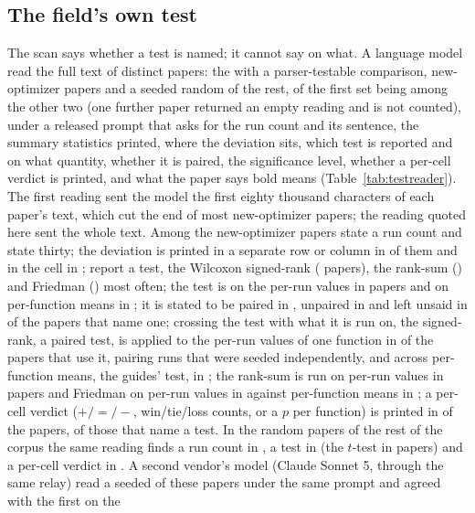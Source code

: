 \documentclass[preprint,review,12pt]{elsarticle}
\begin{document}
\subsection{The field's own test}
\label{sec:tests}

The scan says whether a test is named; it cannot say on what. A language model read the full text of \nTrAllPapers{} distinct papers: the \nTrTestablePapers{} with a parser-testable comparison, \nTrNewOptimizerPapers{} new-optimizer papers and a seeded random \nTrRandomOtherPapers{} of the rest, \nTrOverlap{} of the first set being among the other two (one further paper returned an empty reading and is not counted), under a released prompt that asks for the run count and its sentence, the summary statistics printed, where the deviation sits, which test is reported and on what quantity, whether it is paired, the significance level, whether a per-cell verdict is printed, and what the paper says bold means (Table~\ref{tab:testreader}). The first reading sent the model the first eighty thousand characters of each paper's text, which cut the end of most new-optimizer papers; the reading quoted here sent the whole text. Among the new-optimizer papers \nTrNewOptimizerPctRunsStated{} state a run count and \nTrNewOptimizerPctRunsThirty{} state thirty; the deviation is printed in a separate row or column in \nTrNewOptimizerPctStdOffCell{} of them and in the cell in \nTrNewOptimizerLayoutSameCellPct{}; \nTrNewOptimizerPctTestNamed{} report a test, the Wilcoxon signed-rank (\nTrNewOptimizerTestWilcoxonSignedRank{} papers), the rank-sum (\nTrNewOptimizerTestWilcoxonRankSum{}) and Friedman (\nTrNewOptimizerTestFriedman{}) most often; the test is on the per-run values in \nTrNewOptimizerOnPerRunValues{} papers and on per-function means in \nTrNewOptimizerOnPerFunctionMeans{}; it is stated to be paired in \nTrNewOptimizerPairedYes{}, unpaired in \nTrNewOptimizerPairedNo{} and left unsaid in \nTrNewOptimizerPairedUnsaidAmongNamed{} of the papers that name one; crossing the test with what it is run on, the signed-rank, a paired test, is applied to the per-run values of one function in \nTrNewOptimizerCrossWilcoxonSignedRankPerRunValues{} of the \nTrNewOptimizerSignedRankPapers{} papers that use it, pairing runs that were seeded independently, and across per-function means, the guides' test, in \nTrNewOptimizerCrossWilcoxonSignedRankPerFunctionMeans{}; the rank-sum is run on per-run values in \nTrNewOptimizerCrossWilcoxonRankSumPerRunValues{} papers and Friedman on per-run values in \nTrNewOptimizerCrossFriedmanPerRunValues{} against per-function means in \nTrNewOptimizerCrossFriedmanPerFunctionMeans{}; a per-cell verdict ($+/=/-$, win/tie/loss counts, or a $p$ per function) is printed in \nTrNewOptimizerPctMarkers{} of the papers, \nTrNewOptimizerPctMarkersAmongNamed{} of those that name a test. In the random papers of the rest of the corpus the same reading finds a run count in \nTrRandomOtherPctRunsStated{}, a test in \nTrRandomOtherPctTestNamed{} (the $t$-test in \nTrRandomOtherTestTTest{} papers) and a per-cell verdict in \nTrRandomOtherPctMarkers{}. A second vendor's model (Claude Sonnet 5, through the same relay) read a seeded \nTaPapers{} of these papers under the same prompt and agreed with the first on the 
\end{document}

